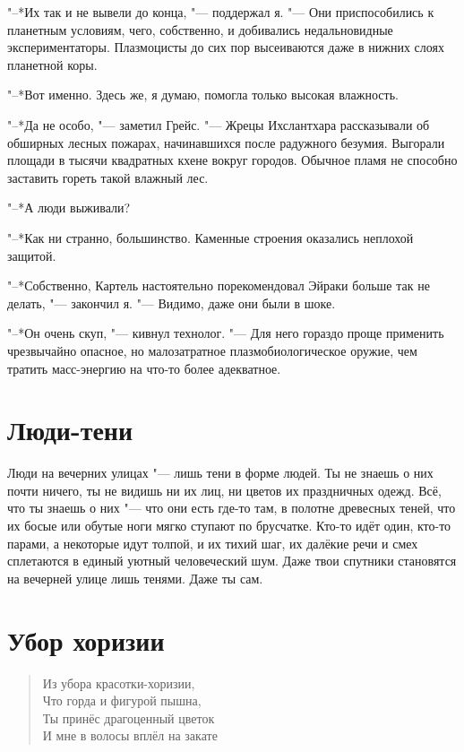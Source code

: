 "--*Их так и не вывели до конца, "--- поддержал я.
"--- Они приспособились к планетным условиям, чего, собственно, и добивались недальновидные экспериментаторы.
Плазмоцисты до сих пор высеиваются даже в нижних слоях планетной коры.

"--*Вот именно.
Здесь же, я думаю, помогла только высокая влажность.

"--*Да не особо, "--- заметил Грейс.
"--- Жрецы Ихслантхара рассказывали об обширных лесных пожарах, начинавшихся после радужного безумия.
Выгорали площади в тысячи квадратных кхене вокруг городов.
Обычное пламя не способно заставить гореть такой влажный лес.

"--*А люди выживали?

"--*Как ни странно, большинство.
Каменные строения оказались неплохой защитой.

"--*Собственно, Картель настоятельно порекомендовал Эйраки больше так не делать, "--- закончил я.
"--- Видимо, даже они были в шоке.

"--*Он очень скуп, "--- кивнул технолог.
"--- Для него гораздо проще применить чрезвычайно опасное, но малозатратное плазмобиологическое оружие, чем тратить масс-энергию на что-то более адекватное.

\section{Люди-тени}

Люди на вечерних улицах "--- лишь тени в форме людей.
Ты не знаешь о них почти ничего, ты не видишь ни их лиц, ни цветов их праздничных одежд.
Всё, что ты знаешь о них "--- что они есть где-то там, в полотне древесных теней, что их босые или обутые ноги мягко ступают по брусчатке.
Кто-то идёт один, кто-то парами, а некоторые идут толпой, и их тихий шаг, их далёкие речи и смех сплетаются в единый уютный человеческий шум.
Даже твои спутники становятся на вечерней улице лишь тенями.
Даже ты сам.

\section{Убор хоризии}

\begin{verse}
Из убора красотки-хоризии,\\
Что горда и фигурой пышна,\\
Ты принёс драгоценный цветок\\
И мне в волосы вплёл на закате\ldotst
\end{verse}

